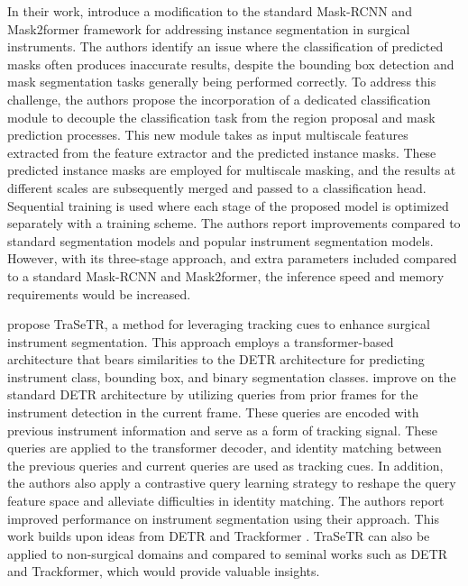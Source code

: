 \documentclass[times,twocolumn,final]{elsarticle}
\renewcommand{\cite}[1]{\citep{#1}}
\begin{document}
In their work, \citet{baby2023forks} introduce a modification to the standard Mask-RCNN and Mask2former framework \citep{he2017mask,cheng2022masked} for addressing instance segmentation in surgical instruments. The authors identify an issue where the classification of predicted masks often produces inaccurate results, despite the bounding box detection and mask segmentation tasks generally being performed correctly. To address this challenge, the authors propose the incorporation of a dedicated classification module to decouple the classification task from the region proposal and mask prediction processes. This new module takes as input multiscale features extracted from the feature extractor and the predicted instance masks. These predicted instance masks are employed for multiscale masking, and the results at different scales are subsequently merged and passed to a classification head. Sequential training is used where each stage of the proposed model is optimized separately with a training scheme. The authors report improvements compared to standard segmentation models and popular instrument segmentation models. However, with its three-stage approach, and extra parameters included compared to a standard Mask-RCNN and Mask2former, the inference speed and memory requirements would be increased.


\citet{zhao2022trasetr} propose TraSeTR, a method for leveraging tracking cues to enhance surgical instrument segmentation. This approach employs a transformer-based architecture that bears similarities to the DETR architecture \citep{carion2020end} for predicting instrument class, bounding box, and binary segmentation classes. \citet{zhao2022trasetr} improve on the standard DETR architecture by utilizing queries from prior frames for the instrument detection in the current frame. These queries are encoded with previous instrument information and serve as a form of tracking signal.  
These queries are applied to the transformer decoder, and identity matching between the previous queries and current queries are used as tracking cues. In addition, the authors also apply a contrastive query learning strategy to reshape the query feature space and alleviate difficulties in identity matching. The authors report improved performance on instrument segmentation using their approach. 
 This work builds upon ideas from DETR \cite{carion2020end} and Trackformer \cite{meinhardt2022trackformer}. TraSeTR can also be applied to non-surgical domains and compared to seminal works such as DETR and Trackformer, which would provide valuable insights.
\end{document}
